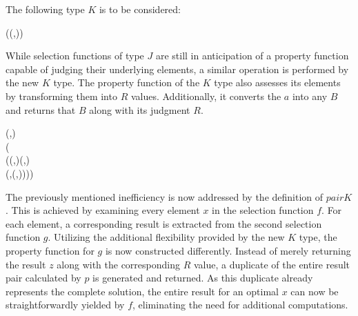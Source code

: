 The following type $K$ is to be considered:
\begin{hscode}\SaveRestoreHook
{}%
%
%
\>[3]{}\;\;\;\mathrel{=}\;\mathbin{\circ}(\to (,))\to {}\<[E]%
\ColumnHook
\end{hscode}\resethooks
While selection functions of type $J$ are still in anticipation of a property function 
capable of judging their underlying elements, a similar operation is performed by the new 
$K$ type. The property function of the $K$ type also assesses its elements by transforming 
them into $R$ values. Additionally, it converts the $a$ into any $B$ and returns that $B$ 
along with its judgment $R$.
\begin{hscode}\SaveRestoreHook
{}%
%
%
%
%
\>[3]{}\mathbin{::}\;\;\to {}\;\;\to {}\;\;(,){}\<[E]%
\\
\>[3]{}\;\;\;\mathrel{=}\;(\lambda {}\to {}\<[E]%
\\
\>[3]{}\<[17]%
\>[17]{}\;(\lambda {}\to {}\;(,)\mathrel{=}\;(,){}\<[E]%
\\
\>[17]{}\<[26]%
\>[26]{}\;(,(,)))){}\<[E]%
\ColumnHook
\end{hscode}\resethooks
The previously mentioned inefficiency is now addressed by the definition of $pairK$. This 
is achieved by examining every element $x$ in the selection function $f$. For each 
element, a corresponding result is extracted from the second selection function $g$.
Utilizing the additional flexibility provided by the new $K$ type, the property function 
for $g$ is now constructed differently. Instead of merely returning the result $z$ along 
with the corresponding $R$ value, a duplicate of the entire result pair calculated by $p$ 
is generated and returned. As this duplicate already represents the complete solution, the 
entire result for an optimal $x$ can now be straightforwardly yielded by $f$, eliminating 
the need for additional computations.

